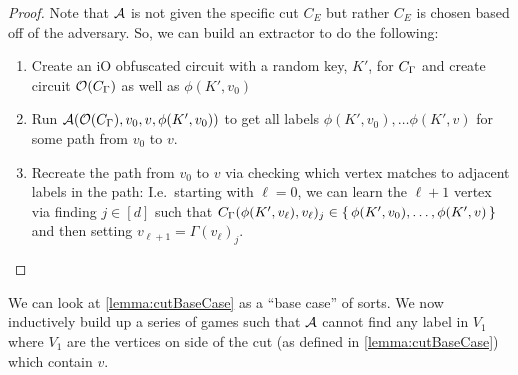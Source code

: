 \begin{lemma}
\begin{proof}
		Note that $\mathcal{A}$ is not given the specific cut $C_E$ but rather $C_E$ is chosen based off of the adversary.
		So, we can build an extractor to do the following:
		\begin{enumerate}
			\item Create an iO obfuscated circuit with a random key, $K'$, for $C_\Gamma$ and create circuit $\mathcal{O}(C_\Gamma)$
			as well as $\phi(K', v_0)$
			\item Run $\mathcal{A}(\mathcal{O}(C_\Gamma), v_0, v, \phi(K', v_0))$ to get all labels $\phi(K', v_0), \dots \phi(K', v)$
			for some path from $v_0$ to $v$.
			\item Recreate the path from $v_0$ to $v$ via checking which vertex matches to adjacent labels in the path:
			I.e.\ starting with $\ell = 0$, we can learn the $\ell + 1$ vertex via finding $j \in [d]$ such that
			$C_\Gamma(\phi(K', v_\ell), v_\ell)_j \in \set{\phi(K', v_0), \dots, \phi(K', v)}$
			 and then setting $v_{\ell + 1} = \Gamma(v_\ell)_j$.
		\end{enumerate}
	\end{proof}
\end{lemma}

We can look at \cref{lemma:cutBaseCase} as a ``base case'' of sorts. We now inductively build up a series of games
such that $\mathcal{A}$ cannot find any label in $V_1$ where $V_1$ are the vertices on side of the cut (as defined in \cref{lemma:cutBaseCase})
which contain $v$.

